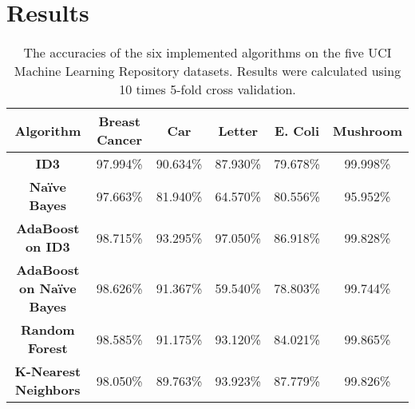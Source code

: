 \documentclass[11pt,titlepage]{article}
\newcommand{\bb}{\textbf}
\begin{document}
\section{Results}
\begin{table} [!htbp]
  \begin{tabular}{ |c|c|c|c|c|c| }
    \hline
    \bb{Algorithm}               & \bb{Breast Cancer} & \bb{Car} & \bb{Letter} & \bb{E. Coli}  & \bb{Mushroom} \\ \hline
    \bb{ID3}                     & 97.994\%           & 90.634\% & 87.930\%    & 79.678\%      & 99.998\%      \\ \hline
    \bb{Naïve Bayes}             & 97.663\%           & 81.940\% & 64.570\%    & 80.556\%      & 95.952\%      \\ \hline
    \bb{AdaBoost on ID3}         & 98.715\%           & 93.295\% & 97.050\%    & 86.918\%      & 99.828\%      \\ \hline
    \bb{AdaBoost on Naïve Bayes} & 98.626\%           & 91.367\% & 59.540\%    & 78.803\%      & 99.744\%      \\ \hline
    \bb{Random Forest}           & 98.585\%           & 91.175\% & 93.120\%    & 84.021\%      & 99.865\%      \\ \hline
    \bb{K-Nearest Neighbors}     & 98.050\%           & 89.763\% & 93.923\%    & 87.779\%      & 99.826\%      \\ \hline
  \end{tabular}
  \caption{The accuracies of the six implemented algorithms on the five UCI Machine Learning Repository datasets. Results were calculated using 10 times 5-fold cross validation.}
  \label{table:accuracies}
\end{table}
\end{document}
